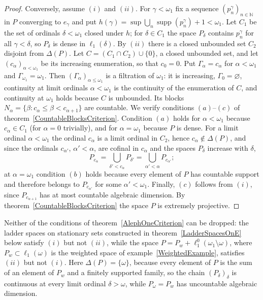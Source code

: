 \documentclass[12pt]{article}
\newcommand{\lo}[1]{\ell_1^0(#1)}
\newcommand{\ellone}[1]{\ell_1(#1)}
\newcommand{\supp}{\operatorname{supp}}
\begin{document}
\begin{proof}
    Conversely, assume $(i)$ and $(ii)$. For $\gamma<\omega_1$ fix a sequence
    ${(p^\gamma_n)}_{n\in\mathbb{N}}$ in $P$ converging to $e_\gamma$ and put
    $h(\gamma)=\sup\bigcup_n\supp(p^\gamma_n)+1<\omega_1$. Let $C_1$ be the
    set of ordinals $\delta<\omega_1$ closed under $h$; for $\delta\in C_1$
    the space $P_\delta$ contains $p^\gamma_n$ for all $\gamma<\delta$, so
    $P_\delta$ is dense in $\ellone{\delta}$. By $(ii)$ there is a closed
    unbounded set $C_2$ disjoint from $\Delta(P)$. Let $C=(C_1\cap C_2)\cup\{0\}$,
    a closed unbounded set, and let ${(c_\alpha)}_{\alpha<\omega_1}$ be its
    increasing enumeration, so that $c_0=0$. Put $\Gamma_\alpha=c_\alpha$ for
    $\alpha<\omega_1$ and $\Gamma_{\omega_1}=\omega_1$. Then
    ${(\Gamma_\alpha)}_{\alpha\leq\omega_1}$ is a filtration of $\omega_1$:
    it is increasing, $\Gamma_0=\varnothing$, continuity at limit ordinals
    $\alpha<\omega_1$ is the continuity of the enumeration of $C$, and
    continuity at $\omega_1$ holds because $C$ is unbounded. Its blocks
    $N_\alpha=\{\beta:c_\alpha\leq\beta<c_{\alpha+1}\}$ are countable. We
    verify conditions $(a)$--$(c)$ of theorem~\ref{CountableBlocksCriterion}.
    Condition $(a)$ holds for $\alpha<\omega_1$ because $c_\alpha\in C_1$ (for
    $\alpha=0$ trivially), and for $\alpha=\omega_1$ because $P$ is dense.
    For a limit ordinal $\alpha<\omega_1$ the ordinal $c_\alpha$ is a limit
    ordinal in $C_2$, hence $c_\alpha\notin\Delta(P)$, and since the ordinals
    $c_{\alpha'}$, $\alpha'<\alpha$, are cofinal in $c_\alpha$ and the
    spaces $P_\delta$ increase with $\delta$,
    \[
    P_{c_\alpha}=\bigcup_{\delta'<c_\alpha}P_{\delta'}
    =\bigcup_{\alpha'<\alpha}P_{c_{\alpha'}};
    \]
    at $\alpha=\omega_1$ condition $(b)$ holds because every element of $P$
    has countable support and therefore belongs to $P_{c_{\alpha'}}$ for some
    $\alpha'<\omega_1$. Finally, $(c)$ follows from $(i)$, since
    $P_{c_{\alpha+1}}$ has at most countable algebraic dimension. By
    theorem~\ref{CountableBlocksCriterion} the space $P$ is extremely
    projective.
\end{proof}

Neither of the conditions of theorem~\ref{AlephOneCriterion} can be dropped:
the ladder spaces on stationary sets constructed in
theorem~\ref{LadderSpacesOnE} below satisfy $(i)$ but not $(ii)$, while the
space
$P=P_w+\lo{\omega_1\setminus\omega}$, where $P_w\subset\ellone{\omega}$ is the
weighted space of example~\ref{WeightedExample}, satisfies $(ii)$ but not
$(i)$. Here $\Delta(P)=\{\omega\}$, because every element of $P$ is the sum
of an element of $P_w$ and a finitely supported family, so the chain
${(P_\delta)}_\delta$ is continuous at every limit ordinal $\delta>\omega$,
while $P_\omega=P_w$ has uncountable algebraic dimension.
\end{document}

